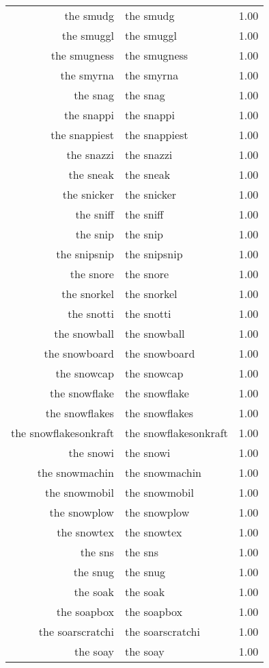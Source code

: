 \begin{table}[ht]
\begin{tabular}{rlr}
  the smudg & the smudg & 1.00 \\ 
  the smuggl & the smuggl & 1.00 \\ 
  the smugness & the smugness & 1.00 \\ 
  the smyrna & the smyrna & 1.00 \\ 
  the snag & the snag & 1.00 \\ 
  the snappi & the snappi & 1.00 \\ 
  the snappiest & the snappiest & 1.00 \\ 
  the snazzi & the snazzi & 1.00 \\ 
  the sneak & the sneak & 1.00 \\ 
  the snicker & the snicker & 1.00 \\ 
  the sniff & the sniff & 1.00 \\ 
  the snip & the snip & 1.00 \\ 
  the snipsnip & the snipsnip & 1.00 \\ 
  the snore & the snore & 1.00 \\ 
  the snorkel & the snorkel & 1.00 \\ 
  the snotti & the snotti & 1.00 \\ 
  the snowball & the snowball & 1.00 \\ 
  the snowboard & the snowboard & 1.00 \\ 
  the snowcap & the snowcap & 1.00 \\ 
  the snowflake & the snowflake & 1.00 \\ 
  the snowflakes & the snowflakes & 1.00 \\ 
  the snowflakesonkraft & the snowflakesonkraft & 1.00 \\ 
  the snowi & the snowi & 1.00 \\ 
  the snowmachin & the snowmachin & 1.00 \\ 
  the snowmobil & the snowmobil & 1.00 \\ 
  the snowplow & the snowplow & 1.00 \\ 
  the snowtex & the snowtex & 1.00 \\ 
  the sns & the sns & 1.00 \\ 
  the snug & the snug & 1.00 \\ 
  the soak & the soak & 1.00 \\ 
  the soapbox & the soapbox & 1.00 \\ 
  the soarscratchi & the soarscratchi & 1.00 \\ 
  the soay & the soay & 1.00 \\ 

\end{tabular}
\end{table}
